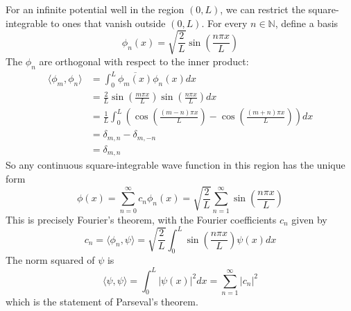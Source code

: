 \begin{example}\label{exa:infinitePotentialWellBasisFunctions}
	For an infinite potential well in the region $(0, L)$, we can restrict the square-integrable to ones that vanish outside $(0, L)$. For every $n \in \mathbb{N}$, define a basis
	\[
		\phi_n(x) = \sqrt{\frac{2}{L}} \sin \left( \frac{n \pi x}{L} \right)
	\]
	The $\phi_n$ are orthogonal with respect to the inner product:
	\[
		\begin{aligned}
			\langle \phi_m, \phi_n \rangle
				& = \int_{0}^{L} \overline{\phi_m(x)} \phi_n(x) dx \\
				& = \frac{2}{L} \sin \left( \frac{m \pi x}{L} \right) \sin \left( \frac{n \pi x}{L} \right) dx \\
				& = \frac{1}{L} \int_{0}^{L} \left( \cos \left( \frac{(m - n) \pi x}{L} \right) - \cos \left( \frac{(m + n) \pi x}{L} \right) \right) dx \\
				& = \delta_{m, n} - \delta_{m, -n} \\
				& = \delta_{m, n}
		\end{aligned}
	\]
	So any continuous square-integrable wave function in this region has the unique form
	\[
		\phi(x) = \sum_{n =0}^{\infty} c_n \phi_n(x) = \sqrt{\frac{2}{L}} \sum_{n = 1}^{\infty} \sin \left( \frac{n \pi x}{L} \right)
	\]
	This is precisely Fourier's theorem, with the Fourier coefficients $c_n$ given by
	\[
		c_n = \langle \phi_n, \psi \rangle = \sqrt{\frac{2}{L}} \int_{0}^{L} \sin \left( \frac{n \pi x}{L} \right) \psi(x) dx
	\]
	The norm squared of $\psi$ is
	\[
		\langle \psi, \psi \rangle = \int_{0}^{L} |\psi(x)|^2 dx = \sum_{n = 1}^{\infty} |c_n|^2
	\]
	which is the statement of Parseval's theorem.
\end{example}

